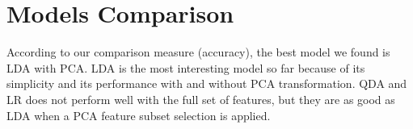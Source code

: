 \documentclass[]{report}
\begin{document}
\section{Models Comparison}

According to our comparison measure (accuracy), the best model we found is LDA with PCA. LDA is the most interesting model so far because of its simplicity and its performance with and without PCA transformation. QDA and LR does not perform well with the full set of features, but they are as good as LDA when a PCA feature subset selection is applied.  
\end{document}
